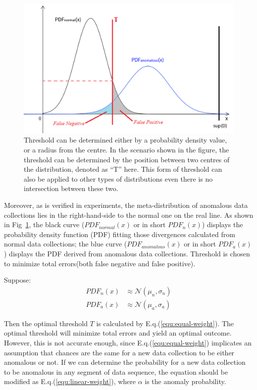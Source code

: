 \documentclass[10pt,conference,letterpaper]{article}
\begin{document}
			\begin{figure}[!t]
				\centering
				\includegraphics[width=\linewidth]{fig/ExampleThreshold.png}
				\caption{Threshold can be determined either by a probability density value, or a radius from the centre. In the scenario shown in the figure, the threshold can be determined by the position between two centres of the distribution, denoted as ``T'' here. This form of threshold can also be applied to other types of distributions even there is no intersection between these two.}
				\label{fig:example-threshold}
			\end{figure}
	
			Moreover, as is verified in experiments, the meta-distribution of anomalous data collections lies in the right-hand-side to the normal one on the real line. As shown in Fig~\ref{fig:example-threshold}, the black curve ($PDF_{normal}(x)$ or in short $PDF_n(x)$) displays the probability density function (PDF) fitting those divergences calculated from normal data collections; the blue curve ($PDF_{anomalous}(x)$ or in short $PDF_a(x)$) displays the PDF derived from anomalous data collections. Threshold is chosen to minimize total errors(both false negative and false positive).
			
			Suppose:
			\begin{align}
				PDF_n(x) &\approx \mathcal{N}(\mu_n, \sigma_n)\\
				PDF_a(x) &\approx \mathcal{N}(\mu_a, \sigma_a)
			\end{align}
			
			Then the optimal threshold $T$ is calculated by E.q.(\ref{equ:equal-weight}). The optimal threshold will minimize total errors and yield an optimal outcome.
			However, this is not accurate enough, since E.q.(\ref{equ:equal-weight}) implicates an assumption that chances are the same for a new data collection to be either anomalous or not. If we can determine the probability for a new data collection to be anomalous in any segment of data sequence, the equation should be modified as E.q.(\ref{equ:linear-weight}), where $\alpha$ is the anomaly probability.
			
\end{document}
